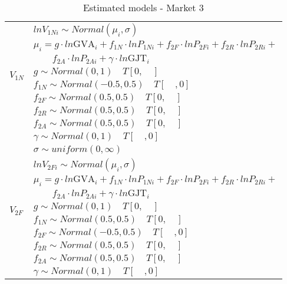 
\begin{table}[!ht] \centering 
  \caption{Estimated models - Market 3} 
  \label{tbl:models_statement_mkt3} 
{\renewcommand\arraystretch{1.25}}
\begin{tabular} {ll}
\toprule
\multirow{8}{*}{$V_{1N}$} &$lnV_{1Ni} \sim Normal(\mu_i, \sigma) $ \\
                          &$\mu_i = g \cdot ln \text{GVA}_i + f_{1N} \cdot lnP_{1Ni} + f_{2F} \cdot lnP_{2Fi} + f_{2R} \cdot lnP_{2Ri} + $\\
                          &$\quad \quad f_{2A} \cdot lnP_{2Ai} + \gamma \cdot ln\text{GJT}_i$ \\
                          &$g \sim Normal (0,1) \quad T[0,\quad]$\\
                          &$f_{1N} \sim Normal (-0.5,0.5) \quad T[\quad,0]$\\
                          &$f_{2F} \sim Normal (0.5,0.5) \quad T[0,\quad]$\\
                          &$f_{2R} \sim Normal (0.5,0.5) \quad T[0,\quad]$\\
                          &$f_{2A} \sim Normal (0.5,0.5) \quad T[0,\quad]$\\
                          &$\gamma \sim Normal (0,1)  \quad T[\quad,0]$\\
                          &$\sigma \sim uniform(0,\infty) $\\ 
\hline
\multirow{8}{*}{$V_{2F}$} &$lnV_{2Fi} \sim Normal(\mu_i, \sigma) $ \\
                          &$\mu_i = g \cdot ln \text{GVA}_i + f_{1N} \cdot lnP_{1Ni} + f_{2F} \cdot lnP_{2Fi} + f_{2R} \cdot lnP_{2Ri} + $\\
                          &$\quad \quad f_{2A} \cdot lnP_{2Ai} + \gamma \cdot ln\text{GJT}_i$ \\
                          &$g \sim Normal (0,1) \quad T[0,\quad]$\\
                          &$f_{1N} \sim Normal (0.5,0.5) \quad T[0,\quad]$\\
                          &$f_{2F} \sim Normal (-0.5,0.5) \quad T[\quad,0]$\\
                          &$f_{2R} \sim Normal (0.5,0.5) \quad T[0,\quad]$\\
                          &$f_{2A} \sim Normal (0.5,0.5) \quad T[0,\quad]$\\
                          &$\gamma \sim Normal (0,1)  \quad T[\quad,0]$\\

\end{tabular}
\end{table}
